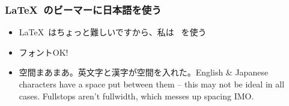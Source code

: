 \begin{frame}
\frametitle{\LaTeX\ のビーマーに日本語を使う}
\begin{itemize}
    \item \LaTeX\ はちょっと難しいですから、私は \XeLaTeX\ を使う
    \item フォントOK!
    \item 空間まあまあ。英文字と漢字が空間を入れた。English \& Japanese
          characters have a space put between them -- this may not be ideal in
          all cases. Fullstops aren't fullwidth, which messes up spacing IMO.
\end{itemize}
\end{frame}
